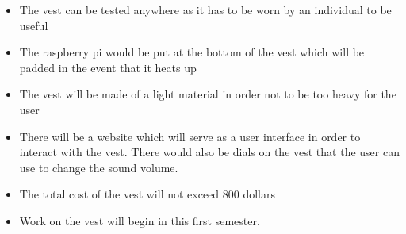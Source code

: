 
\begin{itemize}
  \item The vest can be tested anywhere as it has to be worn by an individual to be useful
  \item The raspberry pi would be put at the bottom of the vest which will be padded in the event that it heats up 
  \item The vest will be made of a light material in order not to be too heavy for the user
  \item There will be a website which will serve as a user interface in order to interact with the vest. There would also be dials on the vest that the user can use to change the sound volume.
  \item The total cost of the vest will not exceed 800 dollars
  \item Work on the vest will begin in this first semester.
\end{itemize}

